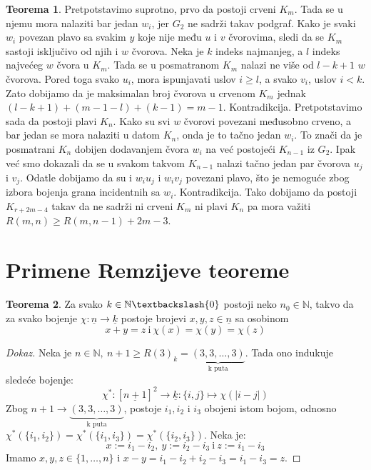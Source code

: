 \documentclass{article}
\theoremstyle{definition}
\newtheorem{teorema}{Teorema}[section]
\newcommand{\dokaz}[1]{\begin{proof}[Dokaz]#1\end{proof}}
\begin{document}
\begin{teorema}
{			Pretpotstavimo suprotno, prvo da postoji crveni $K_m$. Tada se u njemu mora nalaziti bar jedan $w_i$, jer $G_2$ ne sadrži takav podgraf. Kako 			je svaki $w_i$ povezan plavo sa svakim $y$ koje nije među $u$ i $v$ čvorovima, sledi da se $K_m$ sastoji isključivo od njih i $w$ čvorova. Neka je
			$k$ indeks najmanjeg, a $l$ indeks najvećeg $w$ čvora u $K_m$. Tada se u posmatranom $K_m$ nalazi ne više od $l - k + 1$ $w$ čvorova.
			Pored toga svako $u_i$, mora ispunjavati uslov $i \geq l$, a svako $v_i$, uslov $i < k$. Zato dobijamo da je maksimalan broj čvorova u crvenom
			$K_m$ jednak $(l - k + 1) + (m - 1 - l) + (k - 1) = m - 1$. Kontradikcija. \newline
			Pretpotstavimo sada da postoji plavi $K_n$. Kako su svi $w$ čvorovi povezani međusobno crveno, a bar jedan se mora nalaziti u datom $K_n$, 
			onda je to tačno jedan $w_i$. To znači da je posmatrani $K_n$ dobijen dodavanjem čvora $w_i$ na već postojeći $K_{n - 1}$ iz $G_2$. Ipak
			već smo dokazali da se u svakom takvom $K_{n - 1}$ nalazi tačno jedan par čvorova $u_j$ i $v_j$. Odatle dobijamo da su i $w_i u_j$ i $w_i v_j$
			povezani plavo, što je nemoguće zbog izbora bojenja grana incidentnih sa $w_i$. Kontradikcija. \newline
			Tako dobijamo da postoji $K_{r + 2m - 4}$ takav da ne sadrži ni crveni $K_m$ ni plavi $K_n$ pa mora važiti $R(m,n) \geq R(m,n-1) + 2m - 3$.
		}
	\end{teorema}
	
	
	\section{Primene Remzijeve teoreme}
	\begin{teorema}\label{sur}
		Za svako $k \in \mathbb{N}\textbackslash \{0\}$  postoji neko $n_{0} \in \mathbb{N}$, takvo da za svako bojenje $\chi:\underline{n} \rightarrow \underline{k}$ postoje brojevi $x, y, z \in \underline{n}$ sa osobinom 
		\[
		x + y = z \: \mathrm{i} \: \chi(x)= \chi(y)=\chi(z)
		\]
	\end{teorema}
	\dokaz{
		Neka je $n \in \mathbb{N},\: n+1 \geq R(3)_k=\underbrace{(3,3,\ldots,3)}_\text{k puta}$. Tada ono indukuje sledeće bojenje:
		\[
		\chi^*:[\underline{n+1}]^2\rightarrow \underline{k}:\{i,j\}\mapsto \chi(|i-j|)
		\]
		Zbog $n+1 \rightarrow \underbrace{(3,3,\ldots,3)}_\text{k puta}$, postoje $i_1, i_2$ i $i_3$ obojeni istom bojom, odnosno $\chi^*(\{i_1,i_2\})=\chi^*(\{i_1,i_3\})=\chi^*(\{i_2,i_3\})$. Neka je:
		\[
		x:=i_1-i_2,\:y:=i_2-i_3\:\mathrm{i}\:z:=i_1-i_3
		\]
		Imamo $x,y,z\in \{1,\ldots,n\}$ i $x-y=i_1-i_2+i_2-i_3=i_1-i_3=z$.
	}
	
\end{document}
